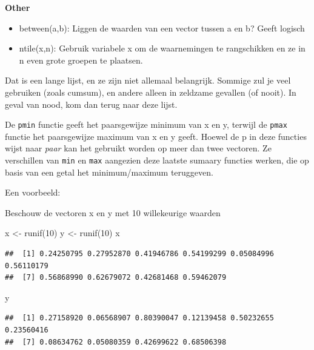 \documentclass[]{tufte-book}
\newenvironment{Shaded}{}{}
\newcommand{\DecValTok}[1]{\textcolor[rgb]{0.25,0.63,0.44}{#1}}
\newcommand{\FunctionTok}[1]{\textcolor[rgb]{0.02,0.16,0.49}{#1}}
\newcommand{\NormalTok}[1]{#1}
\newcommand{\OtherTok}[1]{\textcolor[rgb]{0.00,0.44,0.13}{#1}}
\providecommand{\tightlist}{%
  \setlength{\itemsep}{0pt}\setlength{\parskip}{0pt}}
\begin{document}
\textbf{Other}

\begin{itemize}
\tightlist
\item
  between(a,b): Liggen de waarden van een vector tussen a en b? Geeft logisch
\item
  ntile(x,n): Gebruik variabele x om de waarnemingen te rangschikken en ze in n even grote groepen te plaatsen.
\end{itemize}

Dat is een lange lijst, en ze zijn niet allemaal belangrijk. Sommige zul je veel gebruiken (zoals cumsum), en andere alleen in zeldzame gevallen (of nooit). In geval van nood, kom dan terug naar deze lijst.

De \texttt{pmin} functie geeft het paarsgewijze minimum van x en y, terwijl de \texttt{pmax} functie het paarsgewijze maximum van x en y geeft. Hoewel de p in deze functies wijst naar \emph{paar} kan het gebruikt worden op meer dan twee vectoren. Ze verschillen van \texttt{min} en \texttt{max} aangezien deze laatste sumaary functies werken, die op basis van een getal het minimum/maximum teruggeven.

Een voorbeeld:

Beschouw de vectoren x en y met 10 willekeurige waarden

\begin{Shaded}
\begin{Highlighting}[]
\NormalTok{x }\OtherTok{\textless{}{-}} \FunctionTok{runif}\NormalTok{(}\DecValTok{10}\NormalTok{)}
\NormalTok{y }\OtherTok{\textless{}{-}} \FunctionTok{runif}\NormalTok{(}\DecValTok{10}\NormalTok{)}
\NormalTok{x}
\end{Highlighting}
\end{Shaded}

\begin{verbatim}
##  [1] 0.24250795 0.27952870 0.41946786 0.54199299 0.05084996 0.56110179
##  [7] 0.56868990 0.62679072 0.42681468 0.59462079
\end{verbatim}

\begin{Shaded}
\begin{Highlighting}[]
\NormalTok{y}
\end{Highlighting}
\end{Shaded}

\begin{verbatim}
##  [1] 0.27158920 0.06568907 0.80390047 0.12139458 0.50232655 0.23560416
##  [7] 0.08634762 0.05080359 0.42699622 0.68506398
\end{verbatim}
\end{document}
